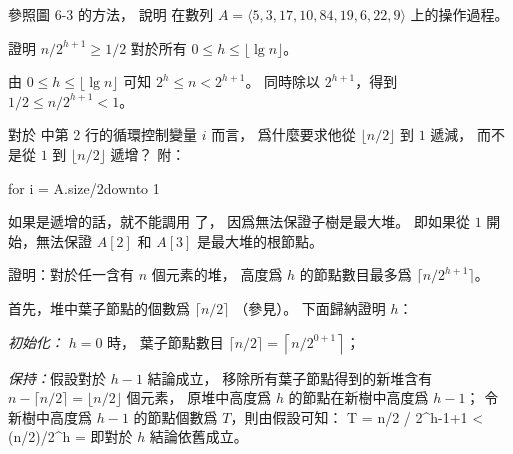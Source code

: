 \startsection[
  title={Building heap},
]

\startEXERCISE
參照圖 6-3 的方法，
說明  在數列 $A = \langle 5, 3, 17, 10, 84, 19, 6, 22, 9 \rangle$ 上的操作過程。
\stopEXERCISE

\startANSWER
\startcombination[3*2]
{\externalfigure[e6_3_1-1]}{}
{\externalfigure[e6_3_1-2]}{}
{\externalfigure[e6_3_1-3]}{}
{\externalfigure[e6_3_1-4]}{}
{\externalfigure[e6_3_1-5]}{}
{}{}
\stopcombination
\stopANSWER

\startEXERCISE
證明 $n/2^{h+1} \ge 1/2$ 對於所有 $0\le h\le \lfloor \lg n\rfloor$。
\stopEXERCISE

\startANSWER
由 $0\le h\le \lfloor \lg n\rfloor$ 可知 $2^h \le n < 2^{h+1}$。
同時除以 $2^{h+1}$，得到 $1/2 \le n/2^{h+1} < 1$。
\stopANSWER

\startEXERCISE
對於  中第 2 行的循環控制變量 $i$ 而言，
爲什麼要求他從 $\lfloor n/2 \rfloor$ 到 $1$ 遞減，
而不是從 $1$ 到 $\lfloor n/2 \rfloor$ 遞增？
附：

\startCLRSCODE
for i = \lfloor A.size/2\rfloor downto 1
\stopCLRSCODE
\stopEXERCISE

\startANSWER
如果是遞增的話，就不能調用  了，
因爲無法保證子樹是最大堆。
即如果從 $1$ 開始，無法保證 $A[2]$ 和 $A[3]$ 是最大堆的根節點。
\stopANSWER

\startEXERCISE
證明：對於任一含有 $n$ 個元素的堆，
高度爲 $h$ 的節點數目最多爲 $\lceil n/2^{h+1} \rceil$。
\stopEXERCISE

\startANSWER
首先，堆中葉子節點的個數爲 $\lceil n/2 \rceil$ （參見）。
下面歸納證明 $h$：

\emph{初始化：} $h = 0$ 時，
葉子節點數目 $\lceil n/2 \rceil = \left\lceil n/2^{0+1} \right\rceil$；

\emph{保持：}假設對於 $h - 1$ 結論成立，
移除所有葉子節點得到的新堆含有 $n-\lceil n/2 \rceil = \lfloor n/2 \rfloor$ 個元素，
原堆中高度爲 $h$ 的節點在新樹中高度爲 $h-1$；
令新樹中高度爲 $h-1$ 的節點個數爲 $T$，則由假設可知：
\startsplitformula\startmathalignment
\NC T \NC = \lceil \lfloor n/2 \rfloor / 2^{h-1+1} \rceil \NR
\NC \NC < \lceil (n/2)/2^h \rceil \NR
\NC \NC = \left\lceil {} \right\rceil \NR
\stopmathalignment\stopsplitformula
即對於 $h$ 結論依舊成立。
\stopANSWER

\stopsection
